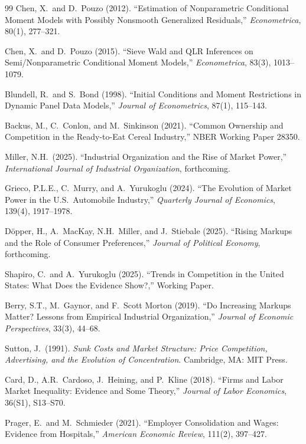 \documentclass[11pt]{article}
\begin{document}
\begin{thebibliography}{99}
 Chen, X.\ and D.\ Pouzo (2012). ``Estimation of Nonparametric Conditional Moment Models with Possibly Nonsmooth Generalized Residuals,'' \emph{Econometrica}, 80(1), 277--321.

 Chen, X.\ and D.\ Pouzo (2015). ``Sieve Wald and QLR Inferences on Semi/Nonparametric Conditional Moment Models,'' \emph{Econometrica}, 83(3), 1013--1079.

 Blundell, R.\ and S.\ Bond (1998). ``Initial Conditions and Moment Restrictions in Dynamic Panel Data Models,'' \emph{Journal of Econometrics}, 87(1), 115--143.

 Backus, M., C.\ Conlon, and M.\ Sinkinson (2021). ``Common Ownership and Competition in the Ready-to-Eat Cereal Industry,'' NBER Working Paper 28350.

 Miller, N.H.\ (2025). ``Industrial Organization and the Rise of Market Power,'' \emph{International Journal of Industrial Organization}, forthcoming.

 Grieco, P.L.E., C.\ Murry, and A.\ Yurukoglu (2024). ``The Evolution of Market Power in the U.S.\ Automobile Industry,'' \emph{Quarterly Journal of Economics}, 139(4), 1917--1978.

 D\"{o}pper, H., A.\ MacKay, N.H.\ Miller, and J.\ Stiebale (2025). ``Rising Markups and the Role of Consumer Preferences,'' \emph{Journal of Political Economy}, forthcoming.

 Shapiro, C.\ and A.\ Yurukoglu (2025). ``Trends in Competition in the United States: What Does the Evidence Show?,'' Working Paper.

 Berry, S.T., M.\ Gaynor, and F.\ Scott Morton (2019). ``Do Increasing Markups Matter? Lessons from Empirical Industrial Organization,'' \emph{Journal of Economic Perspectives}, 33(3), 44--68.

 Sutton, J.\ (1991). \emph{Sunk Costs and Market Structure: Price Competition, Advertising, and the Evolution of Concentration}. Cambridge, MA: MIT Press.

 Card, D., A.R.\ Cardoso, J.\ Heining, and P.\ Kline (2018). ``Firms and Labor Market Inequality: Evidence and Some Theory,'' \emph{Journal of Labor Economics}, 36(S1), S13--S70.

 Prager, E.\ and M.\ Schmieder (2021). ``Employer Consolidation and Wages: Evidence from Hospitals,'' \emph{American Economic Review}, 111(2), 397--427.


\end{thebibliography}
\end{document}

